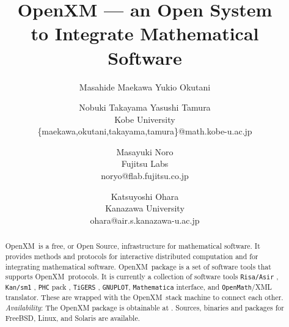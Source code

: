 \documentclass[notitlepage]{book}
\def\OpenXM{{\rm OpenXM\ }}
\begin{document}
\title{OpenXM 
      --- an Open System \\ to Integrate Mathematical Software}
\author{
Masahide Maekawa \quad Yukio Okutani \and Nobuki Takayama \quad Yasushi Tamura\\
Kobe University\\
{\{maekawa,okutani,takayama,tamura\}@math.kobe-u.ac.jp}
\and
{Masayuki Noro}\\
{Fujitsu Labs}\\
{noryo@flab.fujitsu.co.jp}
\and
{Katsuyoshi Ohara}\\
{Kanazawa University}\\
{ohara@air.s.kanazawa-u.ac.jp}
}
\maketitle

\begin{abstract}
\OpenXM is a free, or Open Source, infrastructure for mathematical
software.
It provides methods and protocols 
for interactive distributed computation and
for integrating mathematical software.
\OpenXM package is a set of software tools that supports \OpenXM protocols.
It is currently a collection of software tools
{\tt Risa/Asir} \cite{asir}, {\tt Kan/sm1} \cite{kan},
{\tt PHC} pack \cite{phc}, {\tt TiGERS} \cite{tigers},
{\tt GNUPLOT},
{\tt Mathematica} interface, and
{\tt OpenMath}/XML \cite{OpenMath} translator.
These are wrapped with the \OpenXM stack machine
to connect each other.
{\it Availability}: The OpenXM package is obtainable at \cite{openxm-web}.
Sources, binaries and packages for FreeBSD, Linux, and Solaris
are available.
\end{abstract}





















\end{document}
